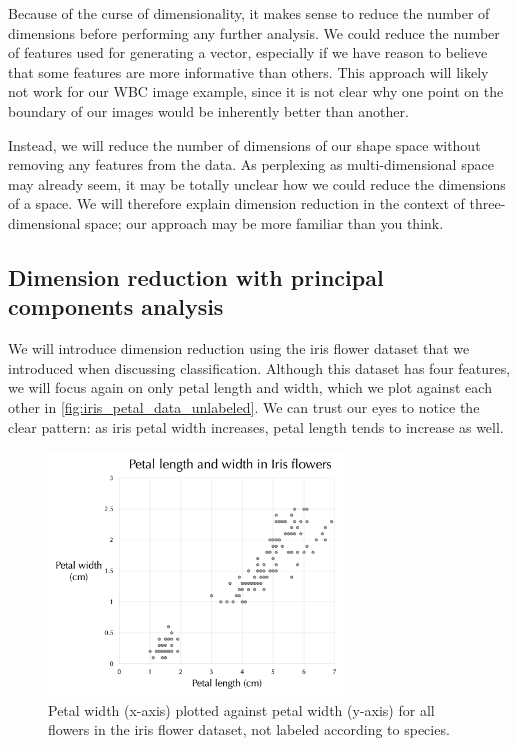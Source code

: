 Because of the curse of dimensionality, it makes sense to reduce the number of dimensions before performing any further analysis. We could reduce the number of features used for generating a vector, especially if we have reason to believe that some features are more informative than others. This approach will likely not work for our WBC image example, since it is not clear why one point on the boundary of our images would be inherently better than another.

Instead, we will reduce the number of dimensions of our shape space without removing any features from the data. As perplexing as multi-dimensional space may already seem, it may be totally unclear how we could reduce the dimensions of a space. We will therefore explain dimension reduction in the context of three-dimensional space; our approach may be more familiar than you think.

\FloatBarrier
{}
\subsection{Dimension reduction with principal components analysis}

We will introduce dimension reduction using the iris flower dataset that we introduced when discussing classification. Although this dataset has four features, we will focus again on only petal length and width, which we plot against each other in \autoref{fig:iris_petal_data_unlabeled}. We can trust our eyes to notice the clear pattern: as iris petal width increases, petal length tends to increase as well.

\begin{figure}[h]
\centering
\mySfFamily
\includegraphics[width = 0.7\textwidth]{../images/iris_petal_data_unlabeled.png}
\caption{Petal width (x-axis) plotted against petal width (y-axis) for all flowers in the iris flower dataset, not labeled according to species.}
\label{fig:iris_petal_data_unlabeled}
\end{figure}

